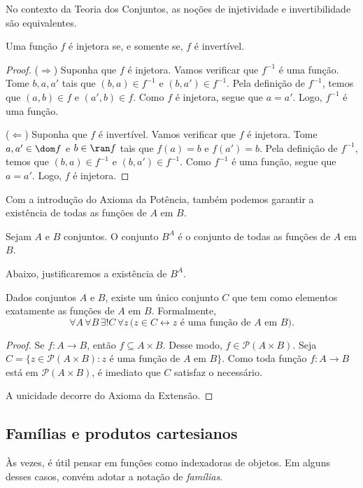 No contexto da Teoria dos Conjuntos, as noções de injetividade e invertibilidade são equivalentes.
\begin{lemma}[$\BST$]\label{lem:injetividadeEInvertibilidade}
    Uma função $f$ é injetora se, e somente se, $f$ é invertível.
\end{lemma}
\begin{proof}
    ($\Rightarrow$) Suponha que $f$ é injetora.
    Vamos verificar que $f^{-1}$ é uma função.
    Tome $b, a, a'$ tais que $(b, a) \in f^{-1}$ e $(b, a') \in f^{-1}$.
    Pela definição de $f^{-1}$, temos que $(a, b) \in f$ e $(a', b) \in f$.
    Como $f$ é injetora, segue que $a = a'$.
    Logo, $f^{-1}$ é uma função.

    ($\Leftarrow$) Suponha que $f$ é invertível.
    Vamos verificar que $f$ é injetora.
    Tome $a, a' \in \dom f$ e $b \in \ran f$ tais que $f(a) = b$ e $f(a') = b$.
    Pela definição de $f^{-1}$, temos que $(b, a) \in f^{-1}$ e $(b, a') \in f^{-1}$.
    Como $f^{-1}$ é uma função, segue que $a = a'$.
    Logo, $f$ é injetora.
\end{proof}

Com a introdução do Axioma da Potência, também podemos garantir a existência de todas as funções de $A$ em $B$.
\begin{definition}[$Z^-$]\label{def:conjuntoDeFuncoes}
    Sejam $A$ e $B$ conjuntos.
    O conjunto $B^A$ é o conjunto de todas as funções de $A$ em $B$.
\end{definition}
Abaixo, justificaremos a existência de $B^A$.
\begin{lemma}[$Z^-$]\label{lem:existenciaDoConjuntoDeFuncoes}
    Dados conjuntos $A$ e $B$, existe um único conjunto $C$ que tem como elementos exatamente as funções de $A$ em $B$.
    Formalmente,
    \[
        \forall A\, \forall B\, \exists! C\, \forall z\, \bigl(z \in C \leftrightarrow z \text{ é uma função de } A \text{ em } B\bigr).
    \]
\end{lemma}
\begin{proof}
    Se $f:A\to B$, então $f\subseteq A\times B$.
    Desse modo, $f\in \mathcal P(A\times B)$.
    Seja $C=\{z \in \mathcal P(A\times B) : z \text{ é uma função de } A \text{ em } B\}$.
    Como toda função $f:A\to B$ está em $\mathcal P(A\times B)$, é imediato que $C$ satisfaz o necessário.
    
    A unicidade decorre do Axioma da Extensão.
\end{proof}

\subsection{Famílias e produtos cartesianos}\label{subsec:familiasEProdutosCartesianos}
Às vezes, é útil pensar em funções como indexadoras de objetos.
Em alguns desses casos, convém adotar a notação de \emph{famílias}.

